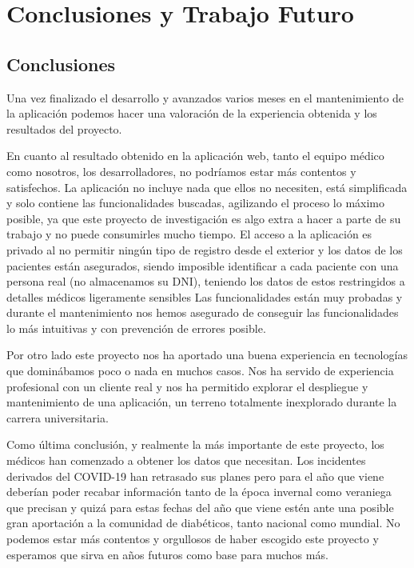 \chapter{Conclusiones y Trabajo Futuro}
    \section{Conclusiones}
    Una vez finalizado el desarrollo y avanzados varios meses en el mantenimiento de la aplicación podemos hacer una valoración de la experiencia obtenida y los resultados del proyecto.
    \newline
    
    En cuanto al resultado obtenido en la aplicación web, tanto el equipo médico como nosotros, los desarrolladores, no podríamos estar más contentos y satisfechos. La aplicación no incluye nada que ellos no necesiten, está simplificada y solo contiene las funcionalidades buscadas, agilizando el proceso lo máximo posible, ya que este proyecto de investigación es algo extra a hacer a parte de su trabajo y no puede consumirles mucho tiempo.   El acceso a la aplicación es privado al no permitir ningún tipo de registro desde el exterior y los datos de los pacientes están asegurados, siendo imposible identificar a cada paciente con una persona real (no almacenamos su DNI), teniendo los datos de estos restringidos a detalles médicos ligeramente sensibles Las funcionalidades están muy probadas y durante el mantenimiento nos hemos asegurado de conseguir las funcionalidades lo más intuitivas y con prevención de errores posible.
    \newline
    
    Por otro lado este proyecto nos ha aportado una buena experiencia en tecnologías que dominábamos poco o nada en muchos casos. Nos ha servido de experiencia profesional con un cliente real y nos ha permitido explorar el despliegue y mantenimiento de una aplicación, un terreno totalmente inexplorado durante la carrera universitaria.
    \newline
    
    Como última conclusión, y realmente la más importante de este proyecto, los médicos han comenzado a obtener los datos que necesitan. Los incidentes derivados del COVID-19 han retrasado sus planes pero para el año que viene deberían poder recabar información tanto de la época invernal como veraniega que precisan y quizá para estas fechas del año que viene estén ante una posible gran aportación a la comunidad de diabéticos, tanto nacional como mundial. No podemos estar más contentos y orgullosos de haber escogido este proyecto y esperamos que sirva en años futuros como base para muchos más. \newline
    
